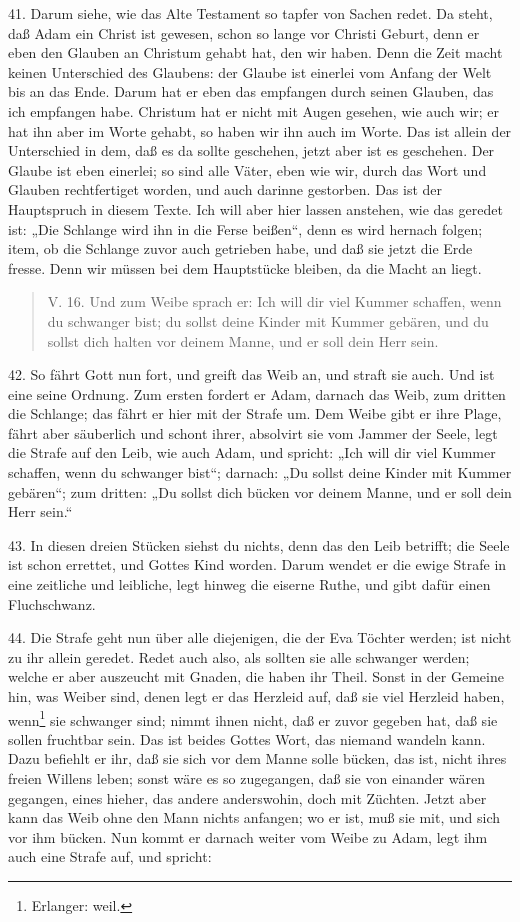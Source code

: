 41. Darum siehe, wie das Alte Testament so tapfer von Sachen redet. Da steht, daß Adam ein Christ ist gewesen, schon so lange vor Christi Geburt, denn er eben den Glauben an Christum gehabt hat, den wir haben. Denn die Zeit macht keinen Unterschied des Glaubens: der Glaube ist einerlei vom Anfang der Welt bis an das Ende. Darum hat er eben das empfangen durch seinen Glauben, das ich empfangen habe. Christum hat er nicht mit Augen gesehen, wie auch wir; er hat ihn aber im Worte gehabt, so haben wir ihn auch im Worte. Das ist allein der Unterschied in dem, daß es da sollte geschehen, jetzt aber ist es geschehen. Der Glaube ist eben einerlei; so sind alle Väter, eben wie wir, durch das Wort und Glauben rechtfertiget worden, und auch darinne gestorben. Das ist der Hauptspruch in diesem Texte. Ich will aber hier lassen anstehen, wie das geredet ist: „Die Schlange wird ihn in die Ferse beißen“, denn es wird hernach folgen; item, ob die Schlange zuvor auch getrieben habe, und daß sie jetzt die Erde fresse. Denn wir müssen bei dem Hauptstücke bleiben, da die Macht an liegt.

\begin{quote}
V. 16. Und zum Weibe sprach er: Ich will dir viel Kummer schaffen, wenn du schwanger bist; du sollst deine Kinder mit Kummer gebären, und du sollst dich halten vor deinem Manne, und er soll dein Herr sein.
\end{quote}

42. So fährt Gott nun fort, und greift das Weib an, und straft sie auch. Und ist eine seine Ordnung. Zum ersten fordert er Adam, darnach das Weib, zum dritten die Schlange; das fährt er hier mit der Strafe um. Dem Weibe gibt er ihre Plage, fährt aber säuberlich und schont ihrer, absolvirt sie vom Jammer der Seele, legt die Strafe auf den Leib, wie auch Adam,
und spricht: „Ich will dir viel Kummer schaffen, wenn du schwanger bist“; darnach: „Du sollst deine Kinder mit Kummer gebären“; zum dritten: „Du sollst dich bücken vor deinem Manne, und er soll dein Herr sein.“

43. In diesen dreien Stücken siehst du nichts, denn das den Leib betrifft; die Seele ist schon errettet, und Gottes Kind worden. Darum wendet er die ewige Strafe in eine zeitliche und leibliche, legt hinweg die eiserne Ruthe, und gibt dafür einen Fluchschwanz.

44. Die Strafe geht nun über alle diejenigen, die der Eva Töchter werden; ist nicht zu ihr allein geredet. Redet auch also, als sollten sie alle schwanger werden; welche er aber auszeucht mit Gnaden, die haben ihr Theil. Sonst in der Gemeine hin, was Weiber sind, denen legt er das Herzleid auf, daß sie viel Herzleid haben, wenn\footnote{Erlanger: weil.} sie schwanger sind; nimmt ihnen nicht, daß er zuvor gegeben hat, daß sie sollen fruchtbar sein. Das ist beides Gottes Wort, das niemand wandeln kann. Dazu befiehlt er ihr, daß sie sich vor dem Manne solle bücken, das ist, nicht ihres freien Willens leben; sonst wäre es so zugegangen, daß sie von einander wären gegangen, eines hieher, das andere anderswohin, doch mit Züchten. Jetzt aber kann das Weib ohne den Mann nichts anfangen; wo er ist, muß sie mit, und sich vor ihm bücken. Nun kommt er darnach weiter vom Weibe zu Adam, legt ihm auch eine Strafe auf, und spricht:

